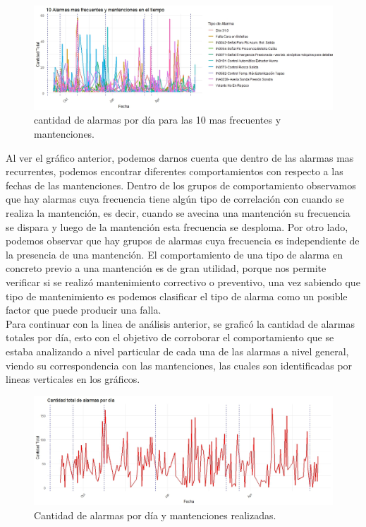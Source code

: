 \documentclass[10pt]{article}
\begin{document}
\begin{figure}[H]
\includegraphics[width=1.1\textwidth]{Graficos/ALARMAS_MAS_FRECUENTES_TOP10 (1).jpeg}
\caption{cantidad de alarmas por día para las 10 mas frecuentes y mantenciones.}
\end{figure}





Al ver el gráfico anterior, podemos darnos cuenta que dentro de las alarmas mas recurrentes, podemos encontrar diferentes comportamientos con respecto a las fechas de las mantenciones. Dentro de los grupos de comportamiento observamos que hay alarmas cuya frecuencia tiene algún tipo de correlación con cuando se realiza la mantención, es decir, cuando se avecina una mantención su frecuencia se dispara y luego de la mantención esta frecuencia se desploma. Por otro lado, podemos observar que hay grupos de alarmas cuya frecuencia es independiente de la presencia de una mantención. El comportamiento de una tipo de alarma en concreto previo a una mantención es de gran utilidad, porque nos permite verificar si se realizó mantenimiento correctivo o preventivo, una vez sabiendo que tipo de mantenimiento es podemos clasificar el tipo de alarma como un posible factor que puede producir una falla.\\

Para continuar con la linea de análisis anterior, se graficó la cantidad de alarmas totales por día, esto con el objetivo de corroborar el comportamiento que se estaba analizando a nivel particular de cada una de las alarmas a nivel general, viendo su correspondencia con las mantenciones, las cuales son identificadas por lineas verticales en los gráficos. 
\\
\begin{figure}[H]
\includegraphics[width=1.1\textwidth]{Graficos/Alarmas_mantenciones_diario.jpeg}
\caption{Cantidad de alarmas por día y mantenciones realizadas.}
\end{figure}
\end{document}
